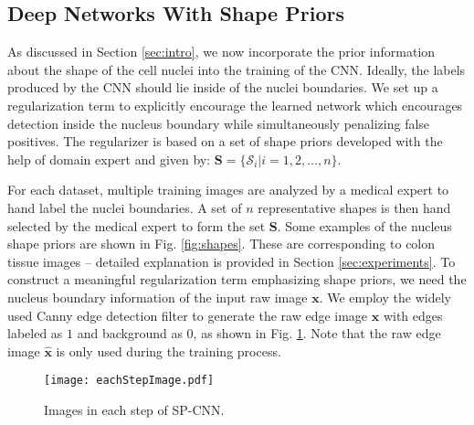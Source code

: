 \documentclass{article}
\begin{document}
\subsection{Deep Networks With Shape Priors}\vspace{-2mm}
As discussed in Section \ref{sec:intro}, we now incorporate the prior information about the shape of the cell nuclei into the training of the CNN. Ideally, the labels produced by the CNN should lie inside of the nuclei boundaries. We set up a regularization term to explicitly encourage the learned network which encourages detection inside the nucleus boundary while simultaneously penalizing false positives. The regularizer is based on a set of shape priors developed with the help of domain expert and given by:
$\mathbf{S} = \{\mathcal{S}_i | i = 1, 2, \dots, n\}$.

For each dataset, multiple training images are analyzed by a medical expert to hand label the nuclei boundaries. A set of $n$ representative shapes is then hand selected by the medical expert to form the set $\mathbf S$. Some examples of the nucleus shape priors are shown in Fig. \ref{fig:shapes}. These are corresponding to colon tissue images -- detailed explanation is provided in Section \ref{sec:experiments}.  To construct a meaningful regularization term emphasizing shape priors, we need the nucleus boundary information of the input raw image $\mathbf x$. We employ the widely used Canny edge detection filter \cite{Canny} to generate the raw edge image $\mathbf{\hat{x}}$ with edges labeled as $1$ and background as $0$, as shown in Fig. \ref{fig:sample_patches}. Note that the raw edge image $\mathbf{\hat{x}}$ is only used during the training process.

\begin{figure}
	\centering
	\texttt{[image: eachStepImage.pdf]}
	\vspace{-18pt}
	\caption{\ninept Images in each step of SP-CNN.}\vspace{-10pt}	\label{fig:sample_patches}
\end{figure}
\end{document}
